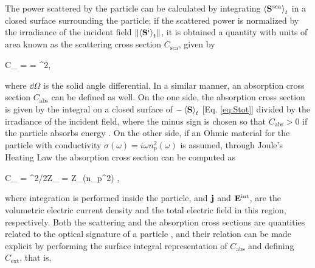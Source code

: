 The power scattered by the particle can be calculated by integrating $\ev{\vb{S}^\text{sca}}_t$ in a closed surface surrounding the particle; if the scattered power is normalized by the irradiance of the incident field $\norm{\ev{\vb{S}^\text{i}}_t}$, it is obtained a quantity with units of area known as the scattering cross section $C_\text{sca}$, given by
%
 \begin{tcolorbox}[title = Scattering Cross Section,	ams align, breakable]
	C_ = \oint{}\cdot{}
				= \oint{}
									{^2}\dd{\Omega},
 \label{eq:Csca}
 \end{tcolorbox}
%
\noindent where $\dd{\Omega}$ is the solid angle differential.
In a similar manner, an absorption cross section $C_\text{abs}$ can be defined as well. On the one side, the absorption cross section is given by the integral on a closed surface of $-\ev{\vb{S}}_t$  [Eq. \eqref{eq:Stot}] divided by the irradiance of the incident field, where the minus sign is chosen so that $C_\text{abs}>0$ if the particle absorbs energy  \cite{bohren_absorption_1983}. On the other side, if an Ohmic material for the particle with conductivity $\sigma(\omega) = i\omega n_p^2(\omega)$ \cite{jackson_classical_1999} is assumed, through Joule's Heating Law \cite{tsang_scattering_2000} the absorption cross section can be computed as
%
 \begin{tcolorbox}[title = Ohmic Particle - Absorption Cross Section,	ams align, breakable]
 	C_ =	 \int {}
 									{^2/2Z_}
				= \int\omega Z_\Im(n_p^2)  ,
 \label{eq:Cabs}
 \end{tcolorbox}%
%
\noindent where integration is performed inside the particle, and $\vb{j}$  and $\vb{E}^\text{int}$, are the volumetric electric current density and the total electric field in this region, respectively. Both the  scattering and the absorption cross sections are quantities related to the optical signature of a particle \cite{pellarin_forward_2019}, and their relation can be made explicit by performing the surface integral representation of $C_\text{abs}$ and defining $C_\text{ext}$, that is,
